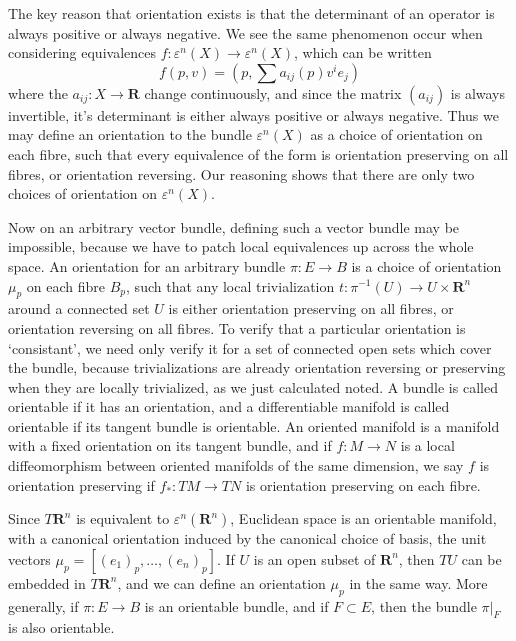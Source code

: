 The key reason that orientation exists is that the determinant of an operator is always positive or always negative. We see the same phenomenon occur when considering equivalences $f: \varepsilon^n(X) \to \varepsilon^n(X)$, which can be written
%
\[ f(p,v) = \left(p, \sum a_{ij}(p) v^i e_j \right) \]
%
where the $a_{ij}: X \to \mathbf{R}$ change continuously, and since the matrix $(a_{ij})$ is always invertible, it's determinant is either always positive or always negative. Thus we may define an orientation to the bundle $\varepsilon^n(X)$ as a choice of orientation on each fibre, such that every equivalence of the form is orientation preserving on all fibres, or orientation reversing. Our reasoning shows that there are only two choices of orientation on $\varepsilon^n(X)$.

Now on an arbitrary vector bundle, defining such a vector bundle may be impossible, because we have to patch local equivalences up across the whole space. An orientation for an arbitrary bundle $\pi: E \to B$ is a choice of orientation $\mu_p$ on each fibre $B_p$, such that any local trivialization $t: \pi^{-1}(U) \to U \times \mathbf{R}^n$ around a connected set $U$ is either orientation preserving on all fibres, or orientation reversing on all fibres. To verify that a particular orientation is `consistant', we need only verify it for a set of connected open sets which cover the bundle, because trivializations are already orientation reversing or preserving when they are locally trivialized, as we just calculated noted. A bundle is called orientable if it has an orientation, and a differentiable manifold is called orientable if its tangent bundle is orientable. An oriented manifold is a manifold with a fixed orientation on its tangent bundle, and if $f: M \to N$ is a local diffeomorphism between oriented manifolds of the same dimension, we say $f$ is orientation preserving if $f_*: TM \to TN$ is orientation preserving on each fibre.

\begin{example}
Since $T\mathbf{R}^n$ is equivalent to $\varepsilon^n(\mathbf{R}^n)$, Euclidean space is an orientable manifold, with a canonical orientation induced by the canonical choice of basis, the unit vectors $\mu_p = [(e_1)_p, \dots, (e_n)_p]$. If $U$ is an open subset of $\mathbf{R}^n$, then $TU$ can be embedded in $T\mathbf{R}^n$, and we can define an orientation $\mu_p$ in the same way. More generally, if $\pi: E \to B$ is an orientable bundle, and if $F \subset E$, then the bundle $\pi|_F$ is also orientable.
\end{example}

